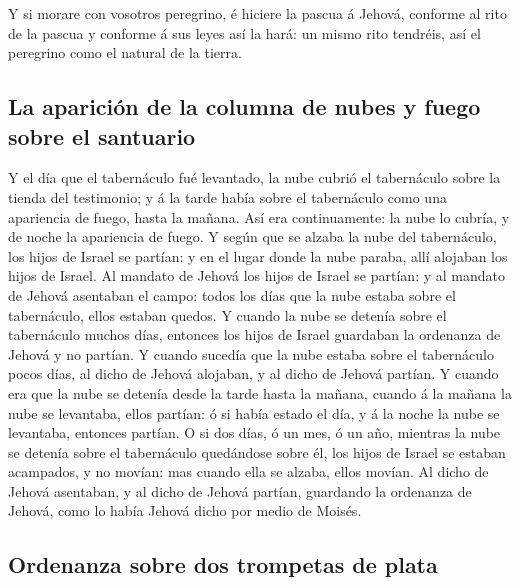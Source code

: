  Y si morare con vosotros peregrino, é hiciere la pascua
á Jehová, conforme al rito de la pascua y conforme á sus leyes así la
hará: un mismo rito tendréis, así el peregrino como el natural de la
tierra.

\hypertarget{la-apariciuxf3n-de-la-columna-de-nubes-y-fuego-sobre-el-santuario}{%
\subsection{La aparición de la columna de nubes y fuego sobre el
santuario}\label{la-apariciuxf3n-de-la-columna-de-nubes-y-fuego-sobre-el-santuario}}

 Y el día que el tabernáculo fué levantado, la nube
cubrió el tabernáculo sobre la tienda del testimonio; y á la tarde había
sobre el tabernáculo como una apariencia de fuego, hasta la mañana.
 Así era continuamente: la nube lo cubría, y de noche la
apariencia de fuego.  Y según que se alzaba la nube del
tabernáculo, los hijos de Israel se partían: y en el lugar donde la nube
paraba, allí alojaban los hijos de Israel.  Al mandato de
Jehová los hijos de Israel se partían: y al mandato de Jehová asentaban
el campo: todos los días que la nube estaba sobre el tabernáculo, ellos
estaban quedos.  Y cuando la nube se detenía sobre el
tabernáculo muchos días, entonces los hijos de Israel guardaban la
ordenanza de Jehová y no partían.  Y cuando sucedía que
la nube estaba sobre el tabernáculo pocos días, al dicho de Jehová
alojaban, y al dicho de Jehová partían.  Y cuando era que
la nube se detenía desde la tarde hasta la mañana, cuando á la mañana la
nube se levantaba, ellos partían: ó si había estado el día, y á la noche
la nube se levantaba, entonces partían.  O si dos días, ó
un mes, ó un año, mientras la nube se detenía sobre el tabernáculo
quedándose sobre él, los hijos de Israel se estaban acampados, y no
movían: mas cuando ella se alzaba, ellos movían.  Al
dicho de Jehová asentaban, y al dicho de Jehová partían, guardando la
ordenanza de Jehová, como lo había Jehová dicho por medio de Moisés.

\hypertarget{ordenanza-sobre-dos-trompetas-de-plata}{%
\subsection{Ordenanza sobre dos trompetas de
plata}\label{ordenanza-sobre-dos-trompetas-de-plata}}

